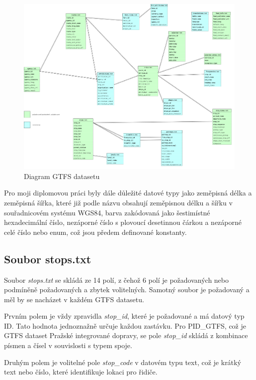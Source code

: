 \begin{figure}[H] \centering
    \includegraphics[width=400pt]{./pictures/GTFS-diagram.PNG}
    \caption[Diagram GTFS datasetu]{Diagram GTFS datasetu}
	\label{fig:GTFS-diagram}              
\end{figure}

Pro moji diplomovou práci byly dále důležité datové typy jako zeměpisná délka a zeměpisná šířka,
které již podle názvu obsahují zeměpisnou délku a šířku v souřadnicovém systému WGS84, barva zakódovaná 
jako šestimístné hexadecimální číslo, nezáporné číslo s plovoucí desetinnou čárkou a nezáporné celé číslo
nebo enum, což jsou předem definované konstanty.

\subsection{Soubor stops.txt}
\label{stops.txt}
Soubor \textit{stops.txt} se skládá ze 14 polí, z čehož 6 polí je požadovaných nebo podmíněně požadovaných 
a zbytek volitelných. Samotný soubor je požadovaný a měl by se nacházet v každém GTFS datasetu.

Prvním polem je vždy zpravidla \textit{stop\_id}, které je požadované a má datový typ ID.
Tato hodnota jednoznažně určuje každou zastávku. Pro PID\_GTFS, což je GTFS dataset Pražské integrované dopravy,
se pole \textit{stop\_id} skládá z kombinace písmen a čísel v souvislosti s typem spoje.

Druhým polem je volitelné pole \textit{stop\_code} v datovém typu text, což je krátký text nebo číslo, 
které identifikuje lokaci pro řidiče. 


